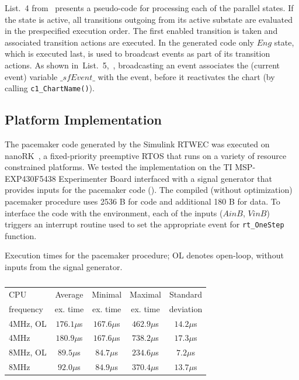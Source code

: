 List.~4 from~ presents a pseudo-code for processing each of the parallel states. If the state is active, all transitions outgoing from its active substate are evaluated in the prespecified execution order. The first enabled transition is taken and associated transition actions are executed. In the generated code only $Eng$ state, which is executed last, is used to broadcast events as part of its transition actions. As shown in~List.~5,~, broadcasting an event associates the (current event) variable $\_sfEvent\_$ with the event, before it reactivates the chart (by calling \texttt{c1\_ChartName()}). 



\subsection{Platform Implementation}
\label{sec:impl}
The pacemaker code generated by the Simulink RTWEC was executed on nanoRK~\cite{nanork}, a fixed-priority preemptive RTOS that runs on a variety of resource constrained platforms. We tested the implementation on the TI MSP-EXP430F5438 Experimenter Board interfaced with a signal generator that provides inputs for the pacemaker code (). The compiled (without optimization) pacemaker procedure uses 2536 B for code and additional 180 B for data. To interface the code with the environment, each of the inputs ($AinB$, $VinB$) triggers an interrupt routine used to set the appropriate event for \texttt{rt\_OneStep} function.

\begin{table}[!b]
Execution times for the pacemaker procedure; OL denotes open-loop, without inputs from the signal generator.
{
\begin{tabular}{|l|c|c|c|c|}
\hline
CPU & Average & Minimal & Maximal & Standard \\ 
frequency & ex. time & ex. time & ex. time & deviation \\\hline
4MHz, OL	& $176.1\mu$s & $167.6\mu$s & $462.9\mu$s & $14.2\mu$s \\\hline
4MHz			& $180.9\mu$s & $167.6\mu$s & $738.2\mu$s & $17.3\mu$s \\\hline		
8MHz, OL	& $89.5\mu$s & $84.7\mu$s & $234.6\mu$s & $7.2\mu$s \\\hline
8MHz			& $92.0\mu$s & $84.9\mu$s & $370.4\mu$s & $13.7\mu$s \\\hline
\end{tabular}
}
\caption{}
\label{tab:MSP430exec_time}

\end{table}



